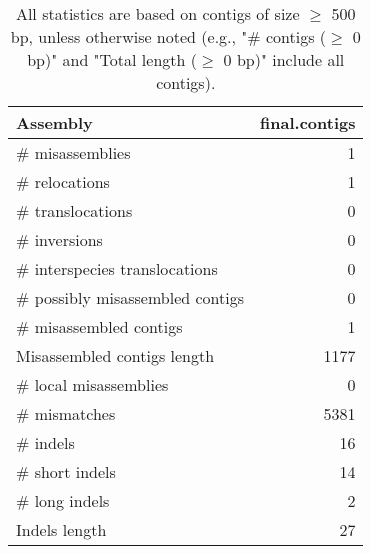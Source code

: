 \documentclass[12pt,a4paper]{article}
\begin{document}
\begin{table}[ht]
\begin{center}
\caption{All statistics are based on contigs of size $\geq$ 500 bp, unless otherwise noted (e.g., "\# contigs ($\geq$ 0 bp)" and "Total length ($\geq$ 0 bp)" include all contigs).}
\begin{tabular}{|l*{1}{|r}|}
\hline
Assembly & final.contigs \\ \hline
\# misassemblies & 1 \\ \hline
\hspace{5mm}\# relocations & 1 \\ \hline
\hspace{5mm}\# translocations & 0 \\ \hline
\hspace{5mm}\# inversions & 0 \\ \hline
\hspace{5mm}\# interspecies translocations & 0 \\ \hline
\# possibly misassembled contigs & 0 \\ \hline
\# misassembled contigs & 1 \\ \hline
Misassembled contigs length & 1177 \\ \hline
\# local misassemblies & 0 \\ \hline
\# mismatches & 5381 \\ \hline
\# indels & 16 \\ \hline
\hspace{5mm}\# short indels & 14 \\ \hline
\hspace{5mm}\# long indels & 2 \\ \hline
Indels length & 27 \\ \hline
\end{tabular}
\end{center}
\end{table}
\end{document}
